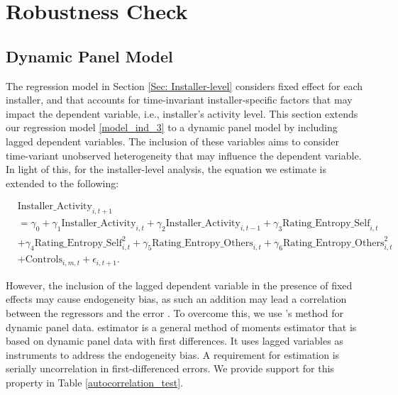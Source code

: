 \documentclass[msom,blindrev]{informs3}
\begin{document}
 





\section{Robustness Check} \label{Sec: Robustness}

\subsection{Dynamic Panel Model}

The regression model in Section \ref{Sec: Installer-level} considers fixed effect for each installer, and that accounts for time-invariant installer-specific factors that may impact the dependent variable, i.e., installer's activity level. This section extends our regression model  \eqref{model_ind_3} to a dynamic panel model by including lagged dependent variables. The inclusion of these variables aims to consider time-variant unobserved heterogeneity that may influence the dependent variable. In light of this, for the installer-level analysis, the equation we estimate is extended to the following:

\begin{align} \nonumber
&\text{Installer\_Activity}_{i,t+1} \\ \nonumber
 &=\gamma_{0}+\gamma_{1} \text{Installer\_Activity}_{i,t}+ \gamma_{2}\text{Installer\_Activity}_{i,t-1}+
\gamma_{3} \text{Rating\_Entropy\_Self}_{i,t} \\ \nonumber
&+ \gamma_{4} \text{Rating\_Entropy\_Self}_{i,t}^ {2} + \gamma_{5} \text{Rating\_Entropy\_Others}_{i,t}  + \gamma_{6} \text{Rating\_Entropy\_Others}_{i,t}^{2} \\ \label{eq: extended_ind}
&+ \text{Controls}_{i,m,t}+ \epsilon_{i,t+1}.
\end{align}

However,  the inclusion of the lagged dependent variable in the presence of fixed effects may cause endogeneity bias, as such an addition may lead a correlation between the regressors and the error \citep{nickell1981biases}. To overcome this, we use \cite{arellano1991some}'s method for dynamic panel data. \cite{arellano1991some} estimator is a general method of moments estimator that is based on dynamic panel data with first differences. It uses lagged variables as instruments to address the endogeneity bias. A requirement for \cite{arellano1991some} estimation is serially uncorrelation in first-differenced errors. We provide support for this property in Table \ref{autocorrelation_test}.
\end{document}
